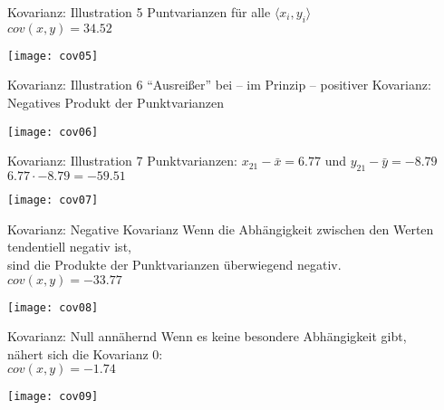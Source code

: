 \begin{frame}
  {Kovarianz: Illustration 5}
  Puntvarianzen für alle $\langle x_i,y_i\rangle$\\
  $cov(x,y)=34.52$
  \begin{center}
    \texttt{[image: cov05]}
  \end{center}
\end{frame}


\begin{frame}
  {Kovarianz: Illustration 6}
  "`Ausreißer"' bei -- im Prinzip -- positiver Kovarianz:\\
  \alert{Negatives Produkt} der Punktvarianzen
  \begin{center}
    \texttt{[image: cov06]}
  \end{center}
\end{frame}


\begin{frame}
  {Kovarianz: Illustration 7}
  Punktvarianzen: $x_{21}-\bar{x}=6.77$ und $y_{21}-\bar{y}=-8.79$\\
  \alert{$6.77\cdot-8.79=-59.51$}
  \begin{center}
    \texttt{[image: cov07]}
  \end{center}
\end{frame}

\begin{frame}
  {Kovarianz: Negative Kovarianz}
  Wenn die Abhängigkeit zwischen den Werten tendentiell negativ ist,\\
  sind die Produkte der Punktvarianzen überwiegend negativ.\\
  $cov(x,y)=-33.77$
  \begin{center}
    \texttt{[image: cov08]}
  \end{center}
\end{frame}

\begin{frame}
  {Kovarianz: Null annähernd}
  Wenn es keine besondere Abhängigkeit gibt,\\
  nähert sich die Kovarianz 0:\\
  $cov(x,y)=-1.74$\\
  \vspace{-1cm}
  \begin{center}
    \texttt{[image: cov09]}
  \end{center}
\end{frame}

